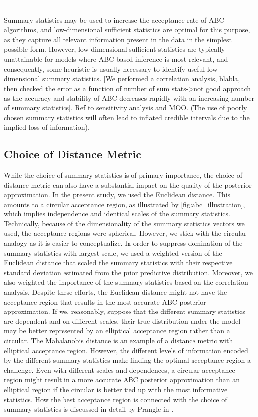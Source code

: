 --- 

Summary statistics may be used to increase the acceptance rate of ABC algorithms, and low-dimensional sufficient statistics are optimal for this purpose, as they capture all relevant information present in the data in the simplest possible form. However, low-dimensional sufficient statistics are typically unattainable for models where ABC-based inference is most relevant, and consequently, some heuristic is usually necessary to identify useful low-dimensional summary statistics. [We performed a correlation analysis, blabla, then checked the error as a function of number of sum stats->not good approach as the accuracy and stability of ABC decreases rapidly with an increasing number of summary statistics]. Ref to sensitivity analysis and MOO. (The use of poorly chosen summary statistics will often lead to inflated credible intervals due to the implied loss of information).

\subsection{Choice of Distance Metric}

While the choice of summary statistics is of primary importance, the choice of distance metric can also have a substantial impact on the quality of the posterior approximation. In the present study, we used the Euclidean distance. This amounts to a circular acceptance region, as illustrated by \autoref{fig:abc_illustration}, which implies independence and identical scales of the summary statistics. Technically, because of the dimensionality of the summary statistics vectors we used, the acceptance regions were spherical. However, we stick with the circular analogy as it is easier to conceptualize. In order to suppress domination of the summary statistics with largest scale, we used a weighted version of the Euclidean distance that scaled the summary statistics with their respective standard deviation estimated from the prior predictive distribution. Moreover, we also weighted the importance of the summary statistics based on the correlation analysis. Despite these efforts, the Euclidean distance might not have the acceptance region that results in the most accurate ABC posterior approximation. If we, reasonably, suppose that the different summary statistics are dependent and on different scales, their true distribution under the model may be better represented by an elliptical acceptance region rather than a circular. The Mahalanobis distance is an example of a distance metric with elliptical acceptance region. However, the different levels of information encoded by the different summary statistics make finding the optimal acceptance region a challenge. Even with different scales and dependences, a circular acceptance region might result in a more accurate ABC posterior approximation than an elliptical region if the circular is better tied up with the most informative statistics. How the best acceptance region is connected with the choice of summary statistics is discussed in detail by Prangle in \cite{prangle_distance}. 



